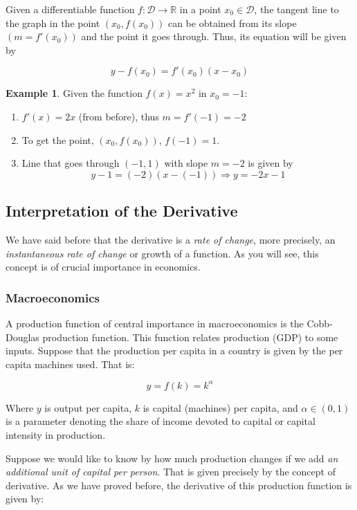 \documentclass[a4paper,11pt]{article}
\theoremstyle{definition}
\newtheorem{example}{Example}
\theoremstyle{plain}
\begin{document}
Given a differentiable function \(f : \mathcal{D}\rightarrow\mathbb{R}\)
in a point \(x_0\in\mathcal{D}\), the tangent line to the graph in the
point \(\left(x_0, f(x_0)\right)\) can be obtained from its slope
\((m = f'(x_0))\) and the point it goes through. Thus, its equation will
be given by

\[
y - f(x_0) = f'(x_0)(x - x_0)
\]

\begin{example}
Given the function \(f(x) = x^2\) in \(x_0 = -1\):

\begin{enumerate}
\def\labelenumi{\arabic{enumi}.}
\item
  \(f'(x) = 2x\) (from before), thus \(m = f'(-1) = -2\)
\item
  To get the point, \(\left(x_0, f(x_0)\right)\), \(f(-1) = 1\).
\item
  Line that goes through \((-1,1)\) with slope \(m = -2\) is given by \[
  y-1 = (-2)(x-(-1)) \Rightarrow y = -2x -1
  \]
\end{enumerate}
\end{example}

\subsection{Interpretation of the
Derivative}\label{interpretation-of-the-derivative}

We have said before that the derivative is a \emph{rate of change}, more
precisely, an \emph{instantaneous rate of change} or growth of a
function. As you will see, this concept is of crucial importance in
economics.

\subsubsection{Macroeconomics}\label{macroeconomics}

A production function of central importance in macroeconomics is the
Cobb-Douglas production function. This function relates production (GDP)
to some inputs. Suppose that the production per capita in a country is
given by the per capita machines used. That is:

\[
y = f(k) = k^{\alpha}
\]

Where \(y\) is output per capita, \(k\) is capital (machines) per
capita, and \(\alpha\in(0,1)\) is a parameter denoting the share of
income devoted to capital or capital intensity in production.

Suppose we would like to know by how much production changes if we add
\emph{an additional unit of capital per person}. That is given precisely
by the concept of derivative. As we have proved before, the derivative
of this production function is given by:
\end{document}
